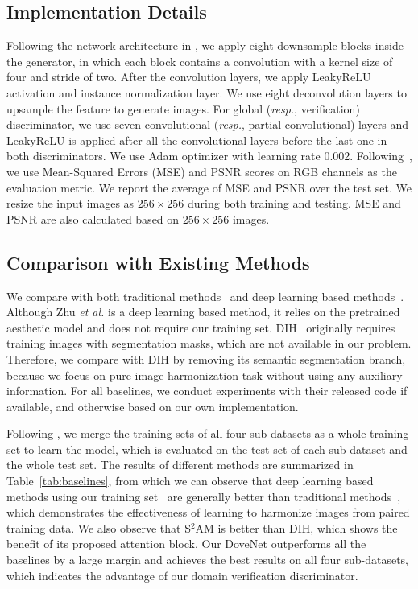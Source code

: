 \documentclass[10pt,twocolumn,letterpaper]{article}
\begin{document}
\subsection{Implementation Details}
Following the network architecture in \cite{isola2017image}, we apply eight downsample blocks inside the generator, in which each block contains a convolution with a kernel size of four and stride of two. After the convolution layers, we apply LeakyReLU activation and instance normalization layer. We use eight deconvolution layers to upsample the feature to generate images. For global (\emph{resp.}, verification) discriminator, we use seven convolutional (\emph{resp.}, partial convolutional) layers and LeakyReLU is applied after all the convolutional layers before the last one in both discriminators.
We use Adam optimizer with learning rate 0.002.
Following~\cite{tsai2017deep}, we use Mean-Squared Errors (MSE) and PSNR scores on RGB channels as the evaluation metric. We report the average of MSE and PSNR over the test set.
We resize the input images as $256\times 256$ during both training and testing. MSE and PSNR are also calculated based on $256\times 256$ images.

\subsection{Comparison with Existing Methods}
We compare with both traditional methods~\cite{lalonde2007using,xue2012understanding} and deep learning based methods~\cite{zhu2015learning,tsai2017deep,xiaodong2019improving}. Although Zhu \emph{et al.} \cite{zhu2015learning} is a deep learning based method, it relies on the pretrained aesthetic model and does not require our training set. DIH~\cite{tsai2017deep} originally requires training images with segmentation masks, which are not available in our problem. Therefore, we compare with DIH by removing its semantic segmentation branch, because we focus on pure image harmonization task without using any auxiliary information.
For all baselines, we conduct experiments with their released code if available, and otherwise based on our own implementation.

Following \cite{tsai2017deep}, we merge the training sets of all four sub-datasets as a whole training set to learn the model, which is evaluated on the test set of each sub-dataset and the whole test set. The results of different methods are summarized in Table~\ref{tab:baselines}, from which we can observe that deep learning based methods using our training set~\cite{tsai2017deep,xiaodong2019improving} are generally better than traditional methods~\cite{lalonde2007using,xue2012understanding}, which demonstrates the effectiveness of learning to harmonize images from paired training data. We also observe that S$^2$AM is better than DIH, which shows the benefit of its proposed attention block. Our DoveNet outperforms all the baselines by a large margin and achieves the best results on all four sub-datasets, which indicates the advantage of our domain verification discriminator.
\end{document}
